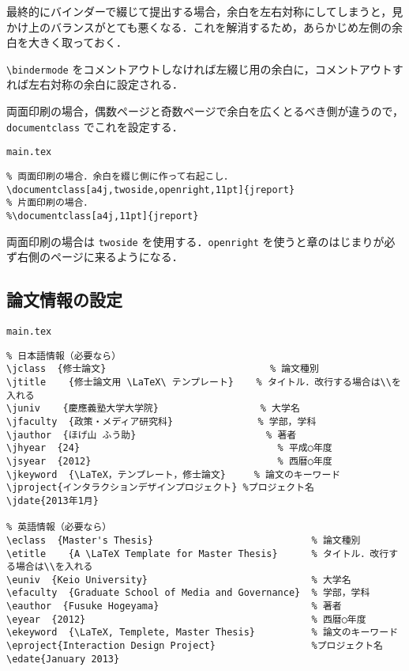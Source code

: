 最終的にバインダーで綴じて提出する場合，余白を左右対称にしてしまうと，見かけ上のバランスがとても悪くなる．これを解消するため，あらかじめ左側の余白を大きく取っておく．

\verb|\bindermode| をコメントアウトしなければ左綴じ用の余白に，コメントアウトすれば左右対称の余白に設定される．

両面印刷の場合，偶数ページと奇数ページで余白を広くとるべき側が違うので，\verb|documentclass| でこれを設定する．

\begin{itembox}[l]{\texttt{main.tex}}
\begin{verbatim}
% 両面印刷の場合．余白を綴じ側に作って右起こし．
\documentclass[a4j,twoside,openright,11pt]{jreport}
% 片面印刷の場合．
%\documentclass[a4j,11pt]{jreport}
\end{verbatim}
\end{itembox}

両面印刷の場合は \verb|twoside| を使用する．\verb|openright| を使うと章のはじまりが必ず右側のページに来るようになる．

\subsection{論文情報の設定}
\label{sec:meta}

\begin{itembox}[l]{\texttt{main.tex}}
\begin{verbatim}
% 日本語情報（必要なら）
\jclass  {修士論文}                             % 論文種別
\jtitle    {修士論文用 \LaTeX\ テンプレート}    % タイトル．改行する場合は\\を入れる
\juniv    {慶應義塾大学大学院}                  % 大学名
\jfaculty  {政策・メディア研究科}               % 学部，学科
\jauthor  {ほげ山 ふう助}                       % 著者
\jhyear  {24}                                   % 平成○年度
\jsyear  {2012}                                 % 西暦○年度
\jkeyword  {\LaTeX，テンプレート，修士論文}     % 論文のキーワード
\jproject{インタラクションデザインプロジェクト} %プロジェクト名
\jdate{2013年1月}

% 英語情報（必要なら）
\eclass  {Master's Thesis}                            % 論文種別
\etitle    {A \LaTeX Template for Master Thesis}      % タイトル．改行する場合は\\を入れる
\euniv  {Keio University}                             % 大学名
\efaculty  {Graduate School of Media and Governance}  % 学部，学科
\eauthor  {Fusuke Hogeyama}                           % 著者
\eyear  {2012}                                        % 西暦○年度
\ekeyword  {\LaTeX, Templete, Master Thesis}          % 論文のキーワード
\eproject{Interaction Design Project}                 %プロジェクト名
\edate{January 2013}
\end{verbatim}
\end{itembox}

